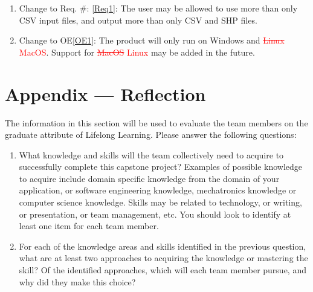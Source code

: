 \documentclass[12pt, titlepage]{article}
\newcommand{\reqref}[1]{Req. \#: \ref{#1}}
\begin{document}
\begin{enumerate}[{LC}1. ]
    \item Change to \reqref{Req1}: The user may be allowed to use more than only CSV input files, and output more than only CSV and SHP files.
    \item Change to OE\ref{OE1}: The product will only run on Windows and \textcolor{red}{\sout{Linux} MacOS}. Support for \textcolor{red}{\sout{MacOS} Linux} may be added in the future.
\end{enumerate}

\section*{Appendix --- Reflection}
The information in this section will be used to evaluate the team members on the
graduate attribute of Lifelong Learning.  Please answer the following questions:

\begin{enumerate}
  \item What knowledge and skills will the team collectively need to acquire to
  successfully complete this capstone project?  Examples of possible knowledge
  to acquire include domain specific knowledge from the domain of your
  application, or software engineering knowledge, mechatronics knowledge or
  computer science knowledge.  Skills may be related to technology, or writing,
  or presentation, or team management, etc.  You should look to identify at
  least one item for each team member.
  \item For each of the knowledge areas and skills identified in the previous
  question, what are at least two approaches to acquiring the knowledge or
  mastering the skill?  Of the identified approaches, which will each team
  member pursue, and why did they make this choice?
\end{enumerate}
\end{document}

